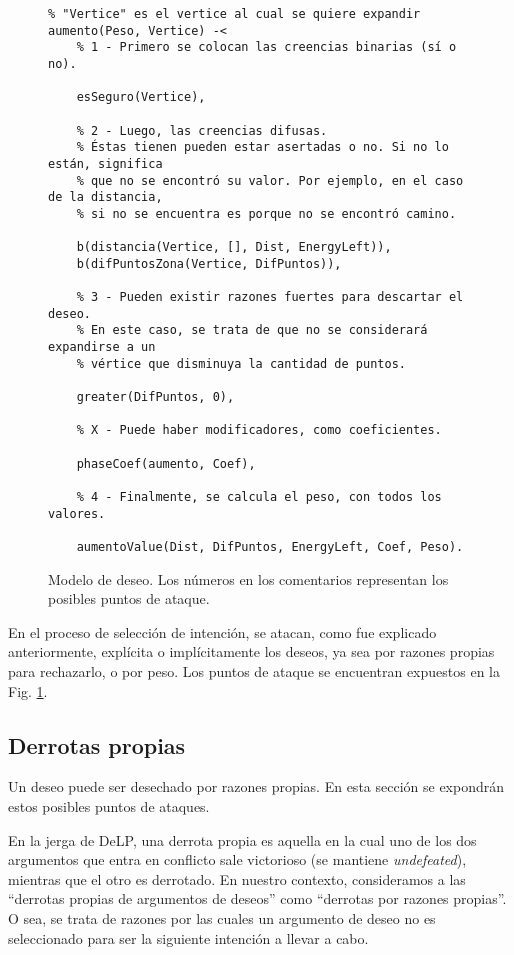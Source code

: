 \documentclass[oneside]{book}
\begin{document}
\begin{figure}
\begin{verbatim}
% "Vertice" es el vertice al cual se quiere expandir
aumento(Peso, Vertice) -< 
    % 1 - Primero se colocan las creencias binarias (sí o no).
    
    esSeguro(Vertice), 
    
    % 2 - Luego, las creencias difusas.
    % Éstas tienen pueden estar asertadas o no. Si no lo están, significa
    % que no se encontró su valor. Por ejemplo, en el caso de la distancia,
    % si no se encuentra es porque no se encontró camino.
    
    b(distancia(Vertice, [], Dist, EnergyLeft)),
    b(difPuntosZona(Vertice, DifPuntos)),
    
    % 3 - Pueden existir razones fuertes para descartar el deseo.
    % En este caso, se trata de que no se considerará expandirse a un 
    % vértice que disminuya la cantidad de puntos.
    
    greater(DifPuntos, 0),
    
    % X - Puede haber modificadores, como coeficientes.
    
    phaseCoef(aumento, Coef),
    
    % 4 - Finalmente, se calcula el peso, con todos los valores.
    
    aumentoValue(Dist, DifPuntos, EnergyLeft, Coef, Peso).
\end{verbatim}
\caption{Modelo de deseo. Los números en los comentarios representan los posibles 
puntos de ataque.}
\label{fig:modeloArgumento}
\end{figure}

En el proceso de selección de intención, se atacan, como fue explicado anteriormente,
explícita o implícitamente los deseos, ya sea por razones propias 
para rechazarlo, o por peso. Los puntos de ataque se encuentran expuestos en la Fig. 
\ref{fig:modeloArgumento}.

\subsection{Derrotas propias}

Un deseo puede ser desechado por razones propias. En esta sección se expondrán estos
posibles puntos de ataques.

En la jerga de DeLP, una derrota propia es aquella en la cual uno de los dos 
argumentos que entra en conflicto sale victorioso (se mantiene \emph{undefeated}),
mientras que el otro es derrotado. En nuestro contexto, consideramos a las 
``derrotas propias de argumentos de deseos'' como ``derrotas por razones propias''. 
O sea, se trata de razones por las cuales un argumento de deseo no es seleccionado
para ser la siguiente intención a llevar a cabo.
\end{document}
